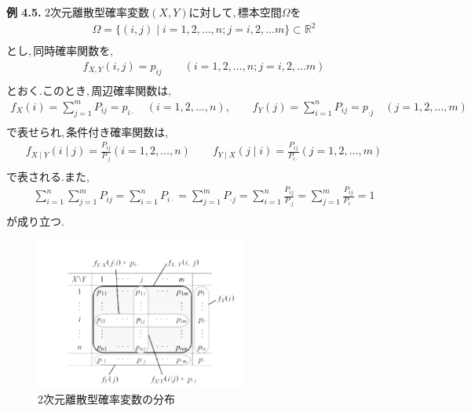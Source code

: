 \documentclass[dvipdfmx,10pt, a4j]{jarticle}
\theoremstyle{definition}
\begin{document}
\noindent
\textbf{例 4.5.} $2次元離散型確率変数(X, Y) に対して, 標本空間 \Omega を$\\
\begin{align*}
    \Omega = \{(i, j) \mid i = 1,2, \dots ,n ; j = i,2, \dots m\} \subset \mathbb{R}^{2}\\
\end{align*}
$とし, 同時確率関数を,$
\begin{align*}
    f_{X, Y}(i, j) = p_{ij} \qquad (i = 1,2, \dots ,n ; j = i,2, \dots m)\\
\end{align*}
$とおく. このとき, 周辺確率関数は,$
\begin{align*}
    f_X(i) = \sum_{j=1}^{m}{P_{ij}} = p_{i \cdot} \quad (i = 1,2, \dots ,n), \qquad f_Y(j) = \sum_{i=1}^{n}{P_{ij}} = p_{\cdot j} \quad (j = 1,2, \dots ,m)\\
\end{align*}
$で表せられ, 条件付き確率関数は,$
\begin{align*}
    f_{X \mid Y}(i \mid j) = \frac{P_{ij}}{P_{\cdot j}}(i = 1,2, \dots ,n) \qquad f_{Y \mid X}(j \mid i) = \frac{P_{ij}}{P_{i \cdot}}(j = 1,2, \dots ,m)\\
\end{align*}
$で表される. また,$
\begin{align*}
    \sum_{i=1}^{n} \sum_{j=1}^{m}{P_{ij}} = \sum_{i=1}^{n}{P_{i \cdot}} = \sum_{j=1}^{m}{P_{\cdot j}} = \sum_{i=1}^{n}{\frac{P_{ij}}{P_{\cdot j}}} = \sum_{j=1}^{m}{\frac{P_{ij}}{P_{i \cdot}}} = 1\\
\end{align*}
$が成り立つ.$
\begin{figure}[htbp]
\begin{center}
\includegraphics[width=7.0cm]{D_9/img_1.png}
\caption{2次元離散型確率変数の分布}
\end{center}
\end{figure}
\end{document}
